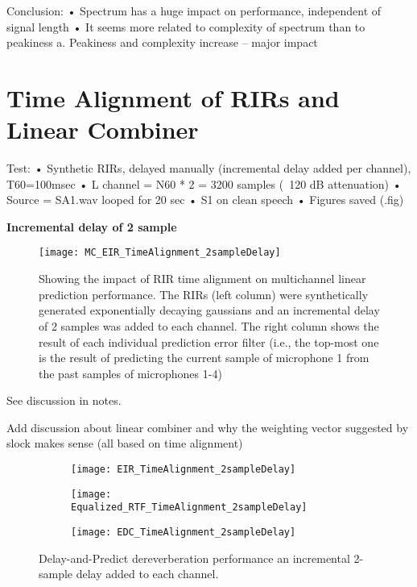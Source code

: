 Conclusion:
•	Spectrum has a huge impact on performance, independent of signal length
•	It seems more related to complexity of spectrum than to peakiness
a.	Peakiness and complexity increase – major impact


\section{Time Alignment of RIRs and Linear Combiner}

Test:
•	Synthetic RIRs, delayed manually (incremental delay added per channel), T60=100msec
•	L channel = N60 * 2 = 3200 samples (~120 dB attenuation)
•	Source = SA1.wav looped for 20 sec
•	S1 on clean speech
•	Figures saved (.fig)

\textbf{Incremental delay of 2 sample}

\begin{figure}[H]
	\texttt{[image: MC\_EIR\_TimeAlignment\_2sampleDelay]}
	\centering
	\caption{Showing the impact of RIR time alignment on multichannel linear prediction performance. The RIRs (left column) were synthetically generated exponentially decaying gaussians and an incremental delay of 2 samples was added to each channel. The right column shows the result of each individual prediction error filter (i.e., the top-most one is the result of predicting the current sample of microphone 1 from the past samples of microphones 1-4)}
	\label{fig:params_MC_EIR_TimeAlignment_2sampleDelay}
\end{figure}

See discussion in notes.

Add discussion about linear combiner and why the weighting vector suggested by slock makes sense (all based on time alignment)

\begin{figure}[H]
	\centering
	\begin{subfigure}[b]{0.32\textwidth}
		\centering
		\texttt{[image: EIR\_TimeAlignment\_2sampleDelay]}
	\end{subfigure}
	\hfill
	\begin{subfigure}[b]{0.32\textwidth}
		\centering
		\texttt{[image: Equalized\_RTF\_TimeAlignment\_2sampleDelay]}
	\end{subfigure}
	\hfill
	\begin{subfigure}[b]{0.32\textwidth}
		\centering
		\texttt{[image: EDC\_TimeAlignment\_2sampleDelay]}
	\end{subfigure}
	\hfill
	\caption{Delay-and-Predict dereverberation performance an incremental 2-sample delay added to each channel.}
	\label{fig:params_TimeAlignment_2sampleDelay}
\end{figure}



